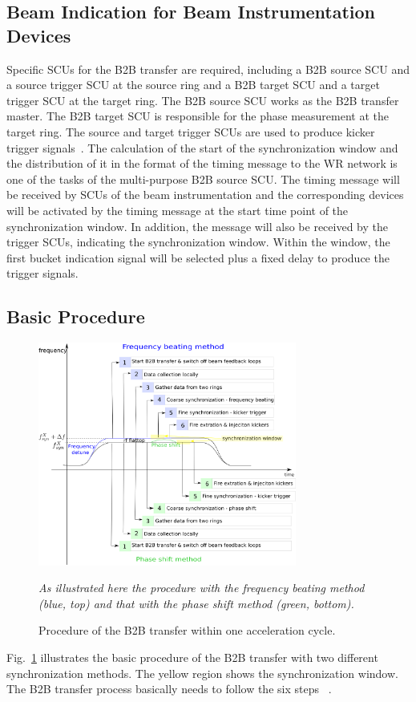 \subsection{Beam Indication for Beam Instrumentation Devices}
Specific SCUs for the B2B transfer are required, including a B2B source SCU and a source trigger SCU at the source ring and a B2B target SCU and a target trigger SCU at the target ring. The B2B source SCU works as the B2B transfer master. The B2B target SCU is responsible for the phase measurement at the target ring. The source and target trigger SCUs are used to produce kicker trigger signals~\cite{bai_f-tc-c-05_2016}. The calculation of the start of the synchronization window and the distribution of it in the format of the timing message to the WR network is one of the tasks of the multi-purpose B2B source SCU. The timing message will be received by SCUs of the beam instrumentation and the corresponding devices will be activated by the timing message at the start time point of the synchronization window. In addition, the message will also be received by the trigger SCUs, indicating the synchronization window. Within the window, the first bucket indication signal will be selected plus a fixed delay to produce the trigger signals.
\subsection{Basic Procedure}
\begin{figure}[!htb]
   \centering   
   \includegraphics*[width=85mm]{procedure.eps}
   \caption{Procedure of the B2B transfer within one acceleration cycle.}
	{\textsl{\small{As illustrated here the procedure with the frequency beating method (blue, top) and that with the phase shift method (green, bottom).}}}
   \label{procedure}
\end{figure}

Fig.~\ref{procedure} illustrates the basic procedure of the B2B transfer with two different synchronization methods. The yellow region shows the synchronization window. The B2B transfer process basically needs to follow the six steps ~\cite{bai_f-tc-c-05_2016}.


